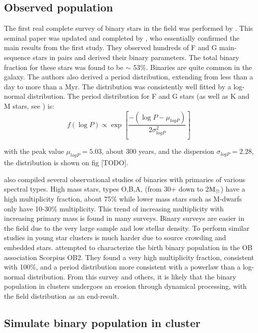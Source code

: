 \subsection{Observed population}

The first real complete survey of binary stars in the field was performed by \cite{DM91}. This seminal paper was updated and completed by \cite{Raghavan2010}, who essentially confirmed the main results from the first study. They observed hundreds of F and G main-sequence stars in pairs and derived their binary parameters. The total binary fraction for these stars was found to be $\sim$ 53\%. Binaries are quite common in the galaxy.
  The authors also derived a period distribution, extending from less than a day to more than a Myr. The distribution was consistently well fitted by a log-normal distribution. The period distribution for F and G stars (as well as K and M stars, see \citealt{Fischer1992}) is:
\begin{equation}
f( \log{P})\propto \exp \left[ \frac{- ( \log{P} - \mu_{logP})}{ 2 \sigma_{logP}^2} \right]
\end{equation}

with the peak value $\mu_{logP} = 5.03$, about 300 years, and the dispersion $\sigma_{logP} = 	2.28$, the distribution is shown on fig [TODO].

\cite{Raghavan2010} also compiled several observational studies of binaries with primaries of various spectral types. High mass stars, types O,B,A, (from 30+ down to 2${\textrm{M}_\odot}$) have a high multiplicity fraction, about 75\%  while lower mass stars such as M-dwarfs only have 10-30\% multiplicity. This trend of increasing multiplicity with increasing primary mass is found in many surveys.
Binary surveys are easier in the field due to the very large sample and low stellar density. To perform similar studies in young star clusters is much harder due to source crowding and embedded stars. \cite{Kouwenhoven2007} attempted to characterize the birth binary population in the OB association Scorpius OB2. They found a very high multiplicity fraction, consistent with 100\%, and a period distribution more consistent with a powerlaw than a log-normal distribution. From this survey and others, it is likely that the binary population in clusters undergoes an erosion through dynamical processing, with the field distribution as an end-result.

\subsection{Simulate binary population in cluster}

